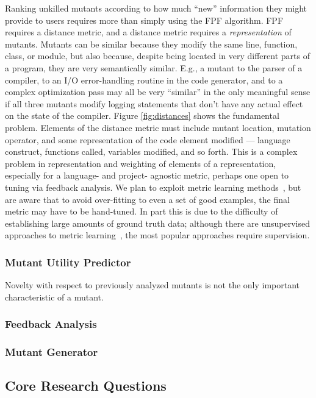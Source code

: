 Ranking unkilled mutants according to how much ``new'' information they might
provide to users requires more than simply using the FPF algorithm.
FPF requires a distance metric, and a distance metric requires a
\emph{representation} of mutants.  Mutants can be similar because they
modify the same line, function, class, or module, but also because,
despite being located in very different parts of a program, they are
very semantically similar.  E.g., a mutant to the parser of a compiler, to
an I/O error-handling routine in the code generator, and to a complex
optimization pass may all be very ``similar'' in the only meaningful
sense if all three mutants modify logging statements that don't have
any actual effect on the state of the compiler.  Figure
\ref{fig:distances} shows the fundamental problem.  Elements of the
distance metric must include mutant location, mutation operator, and
some representation of the code element modified --- language
construct, functions called, variables modified, and so forth.  This
is a complex problem in representation and weighting of elements of a
representation, especially for a language- and
project- agnostic metric, perhaps one open to tuning via feedback
analysis.  We plan to exploit metric learning
methods~\cite{kulis2012metric}, but are aware that to avoid over-fitting
to even a set of good examples, the final metric may have to be
hand-tuned.  In part this is due to the difficulty of establishing
large amounts of ground truth data; although there are unsupervised
approaches to metric learning~\cite{scholkopf1998nonlinear,tipping1999probabilistic}, the most popular approaches require supervision.

\subsubsection{Mutant Utility Predictor}

Novelty with respect to previously analyzed mutants is not the only
important characteristic of a mutant.  

\subsubsection{Feedback Analysis}

\subsubsection{Mutant Generator}
\label{sec:anylangplan}

\subsection{Core Research Questions}


